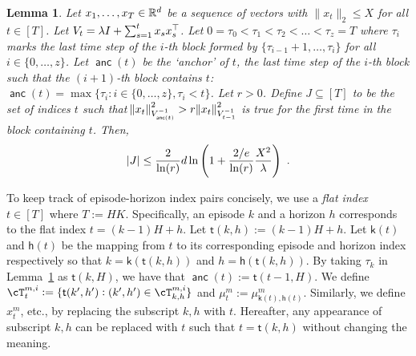 \documentclass{article}
\newtheorem{lemma}{Lemma}
\DeclareMathOperator{\anc}{\mathsf{anc}}
\def\sft{\mathsf{t}}
\def\sfh{\mathsf{h}}
\def\sfk{\mathsf{k}}
\newcommand{\blue}[1]{{\color[rgb]{.3,.5,1}#1}}
\newcommand{\kj}[1]{{\color{Magenta}[KJ: #1]}}
\newcommand{\gray}[1]{{ \color[rgb]{.6,.6,.6} #1 }}
\renewcommand{\blue}[1]{#1}
\begin{document}
\begin{lemma}\label{lem:epc2}
  Let $x_1, \ldots, x_T\in{\mathbb{R}}^d$ be a sequence of vectors with $\|x_t\|_2 \le X$ for all $t\in[T]$.
  Let ${V_t} = {\lambda} I + \sum_{s=1}^{t} x_s x_s^{\top}$.
  Let $0 = \tau_0 < \tau_1 < \tau_2 < \ldots < \tau_z = T$ where $\tau_i$ marks the last time step of the $i$-th block formed by $\{\tau_{i-1} + 1, \ldots, \tau_i\}$ for all $i\in\{0,\ldots,z\}$.
  Let $\anc(t)$ be the `anchor' of $t$, the last time step of the $i$-th block such that the $(i+1)$-th block contains $t$: $\anc(t) = \max\{\tau_i: i \in \{0,\ldots,z\},  \tau_i < t\}$.
  Let $r>0$.
  Define ${J} \subseteq[T]$ to be the set of indices $t$ such that $\norm{x_t}^2_{V_{\anc(t)}^{-1}} > r \norm{x_t}^{2}_{V_{t-1}^{-1}} $
  is true for the first time in the block containing $t$.
  Then,
  \begin{align*}
    |J| \le \frac{2}{\ln(r)} d \ln \del{1 + \fr{2/e}{\ln(r)}\frac{X^2} \lam}~.
  \end{align*}
\end{lemma}


To keep track of episode-horizon index pairs concisely, we use a \textit{flat index} $t \in [T]$ where $\blue{T} := HK$.
Specifically, an episode $k$ and a horizon $h$ corresponds to the flat index $t = (k-1)H + h$.
Let $\blue{\sft(k,h)} :=  (k-1)H + h$.
Let $\blue{\sfk(t)}$ and $\blue{\sfh(t)}$ be the mapping from $t$ to its corresponding episode and horizon index respectively so that $k = \sfk(\sft(k,h))$ and $h = \sfh(\sft(k,h))$.
By taking $\tau_k$ in Lemma~\ref{lem:epc2} as $\sft(k,H)$, we have that $\blue{\anc(t)} := \sft(t-1,H)$.
We define $\blue{\cT_t^{m,i}} := \{\sft(k',h'): (k',h') \in \cT_{k,h}^{m,i}\}$ and $\mu^m_t := \mu^m_{\sfk(t), \sfh(t)}$.
Similarly, we define $x^m_t$, etc., by replacing the subscript $k,h$ with $t$. 
Hereafter, any appearance of subscript $k,h$ can be replaced with $t$ such that $t = \sft(k,h)$ without changing the meaning.
\end{document}
